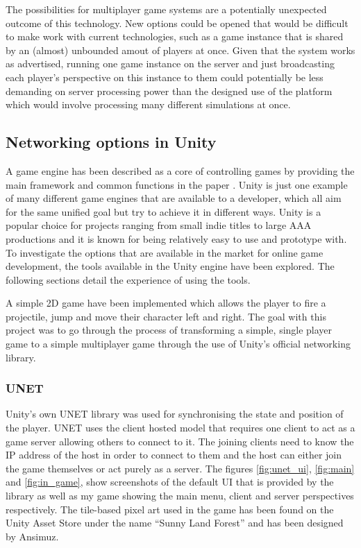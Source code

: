 The possibilities for multiplayer game systems are a potentially unexpected outcome of this technology. New options could be opened that would be difficult to make work with current technologies, such as a game instance that is shared by an (almost) unbounded amout of players at once. Given that the system works as advertised, running one game instance on the server and just broadcasting each player's perspective on this instance to them could potentially be less demanding on server processing power than the designed use of the platform which would involve processing many different simulations at once.


\subsection{Networking options in Unity}
A game engine has been described as a core of controlling games by providing the main framework and common functions in the paper . Unity is just one example of many different game engines that are available to a developer, which all aim for the same unified goal but try to achieve it in different ways. Unity is a popular choice for projects ranging from small indie titles to large AAA productions and it is known for being relatively easy to use and prototype with. To investigate the options that are available in the market for online game development, the tools available in the Unity engine have been explored. The following sections detail the experience of using the tools.

A simple 2D game have been implemented which allows the player to fire a projectile, jump and move their character left and right. The goal with this project was to go through the process of transforming a simple, single player game to a simple multiplayer game through the use of Unity's official networking library.

\subsubsection{UNET}
Unity's own UNET library was used for synchronising the state and position of the player. UNET uses the client hosted model that requires one client to act as a game server allowing others to connect to it. The joining clients need to know the IP address of the host in order to connect to them and the host can either join the game themselves or act purely as a server. The figures \ref{fig:unet_ui}, \ref{fig:main} and \ref{fig:in_game}, show screenshots of the default UI that is provided by the library as well as my game showing the main menu, client and server perspectives respectively. The tile-based pixel art used in the game has been found on the Unity Asset Store under the name ``Sunny Land Forest'' and has been designed by Ansimuz.

